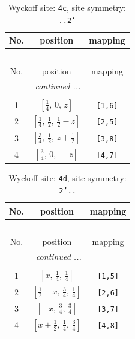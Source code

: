 \documentclass[fleqn,8pt]{jsarticle}
\begin{document}
\renewcommand{\arraystretch}{1.2}
\begin{longtable}{ccc}
\caption{Wyckoff site: {\tt 4c}, site symmetry: {\tt ..2'}}
 \\
 \hline \hline
No. & position & mapping \\ \hline \endfirsthead

\multicolumn{2}{l}{\tablename\ \thetable{}} \\
 \hline \hline
No. & position & mapping \\ \hline \endhead

 \hline \hline
\multicolumn{2}{r}{\footnotesize\it continued ...} \\ \endfoot

 \hline \hline
\multicolumn{2}{r}{} \\ \endlastfoot

1 & $\left[ \frac{1}{4},\, 0,\, z \right]$ & {\tt [1,6]} \\ \hline
2 & $\left[ \frac{1}{4},\, \frac{1}{2},\, \frac{1}{2} - z \right]$ & {\tt [2,5]} \\ \hline
3 & $\left[ \frac{3}{4},\, \frac{1}{2},\, z + \frac{1}{2} \right]$ & {\tt [3,8]} \\ \hline
4 & $\left[ \frac{3}{4},\, 0,\, - z \right]$ & {\tt [4,7]} \\
\end{longtable}
\renewcommand{\arraystretch}{1.2}
\begin{longtable}{ccc}
\caption{Wyckoff site: {\tt 4d}, site symmetry: {\tt 2'..}}
 \\
 \hline \hline
No. & position & mapping \\ \hline \endfirsthead

\multicolumn{2}{l}{\tablename\ \thetable{}} \\
 \hline \hline
No. & position & mapping \\ \hline \endhead

 \hline \hline
\multicolumn{2}{r}{\footnotesize\it continued ...} \\ \endfoot

 \hline \hline
\multicolumn{2}{r}{} \\ \endlastfoot

1 & $\left[ x,\, \frac{1}{4},\, \frac{1}{4} \right]$ & {\tt [1,5]} \\ \hline
2 & $\left[ \frac{1}{2} - x,\, \frac{3}{4},\, \frac{1}{4} \right]$ & {\tt [2,6]} \\ \hline
3 & $\left[ - x,\, \frac{3}{4},\, \frac{3}{4} \right]$ & {\tt [3,7]} \\ \hline
4 & $\left[ x + \frac{1}{2},\, \frac{1}{4},\, \frac{3}{4} \right]$ & {\tt [4,8]} \\
\end{longtable}
\end{document}
